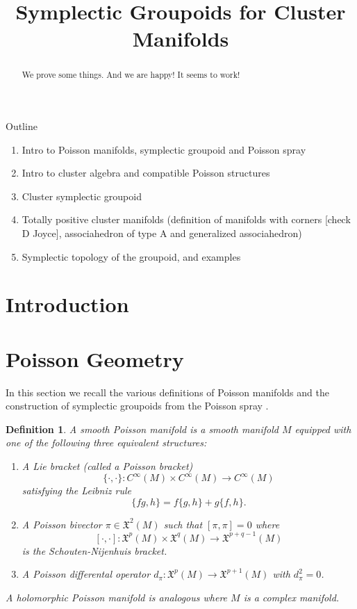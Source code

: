 \documentclass{amsart}
\title{Symplectic Groupoids for Cluster Manifolds}
\newtheorem{definition}[theorem]{Definition}
\begin{document}
\begin{abstract}
  We prove some things.
  And we are happy!
  It seems to work!
\end{abstract}
\maketitle
Outline
\begin{enumerate}
	\item Intro to Poisson manifolds, symplectic groupoid and Poisson spray
	\item Intro to cluster algebra and compatible Poisson structures 
	\item Cluster symplectic groupoid
	\item Totally positive cluster manifolds (definition of manifolds with corners [check D Joyce], associahedron of type A and generalized associahedron)
	\item Symplectic topology of the groupoid, and examples
\end{enumerate}

\section{Introduction}


\section{Poisson Geometry}
In this section we recall the various definitions of Poisson manifolds and the construction of symplectic groupoids from the Poisson spray \cite{MR2900786}.

\begin{definition}
A smooth Poisson manifold is a smooth manifold $M$ equipped with one of the following three equivalent structures:
  \begin{enumerate}
    \item A Lie bracket (called a Poisson bracket)
      $$
				\{\cdot, \cdot\}: C^\infty(M) \times C^\infty(M) \to C^\infty(M)
			$$
				satisfying the Leibniz rule
			$$
				\{fg, h\} = f\{g,h\} + g\{f,h\}.
			$$
		\item A Poisson bivector $\pi \in \mathfrak{X}^2(M)$ such that $[\pi, \pi] = 0$ where
			$$
				[\cdot, \cdot]: \mathfrak{X}^p(M) \times \mathfrak{X}^q(M) \to \mathfrak{X}^{p+q-1}(M)
			$$
			is the Schouten-Nijenhuis bracket.
		\item A Poisson differental operator $d_\pi: \mathfrak{X}^p(M) \to \mathfrak{X}^{p+1}(M)$ with $d_\pi^2 = 0$.
\end{enumerate}	
	A holomorphic Poisson manifold is analogous where $M$ is a complex manifold.
\end{definition}
\end{document}
